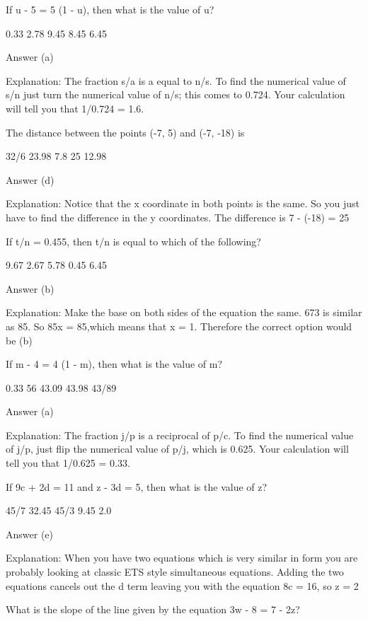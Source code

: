     If u - 5 = 5 (1 - u), then what is the value of u?

        0.33
        2.78
        9.45
        8.45
        6.45 

    Answer (a)

    Explanation: The fraction s/a is a equal to n/s. To find the numerical value of s/n just turn the numerical value of n/s; this comes to 0.724. Your calculation will tell you that 1/0.724 = 1.6.

    The distance between the points (-7, 5) and (-7, -18) is

        32/6
        23.98
        7.8
        25
        12.98 

    Answer (d)

    Explanation: Notice that the x coordinate in both points is the same. So you just have to find the difference in the y coordinates. The difference is 7 - (-18) = 25

    If t/n = 0.455, then t/n is equal to which of the following?

        9.67
        2.67
        5.78
        0.45
        6.45 

    Answer (b)

    Explanation: Make the base on both sides of the equation the same. 673 is similar as 85. So 85x = 85,which means that x = 1. Therefore the correct option would be (b)

    If m - 4 = 4 (1 - m), then what is the value of m?

        0.33
        56
        43.09
        43.98
        43/89 

    Answer (a)

    Explanation: The fraction j/p is a reciprocal of p/c. To find the numerical value of j/p, just flip the numerical value of p/j, which is 0.625. Your calculation will tell you that 1/0.625 = 0.33.

    If 9c + 2d = 11 and z - 3d = 5, then what is the value of z?

        45/7
        32.45
        45/3
        9.45
        2.0 

    Answer (e)

    Explanation: When you have two equations which is very similar in form you are probably looking at classic ETS style simultaneous equations. Adding the two equations cancels out the d term leaving you with the equation 8c = 16, so z = 2

    What is the slope of the line given by the equation 3w - 8 = 7 - 2z?

